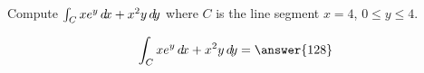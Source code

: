 \documentclass{ximera}
\author{David Guichard \and Neal Koblitz \and H. Jerome Keisler \and Albert Scheller \and Barry Balof \and Mike Wills \and Matthew Carr}
\begin{document}
\begin{exercise}




Compute $\int_C xe^y\mathop{}\!d\! x+x^2 y\mathop{}\!d\! y$ where $C$ is the line segment $x=4$, $0\le y\le 4$.

\begin{prompt}
\[
\int_C xe^y\d x+x^2 y\d y=\answer{128}
\]
\end{prompt}



\end{exercise}
\end{document}
